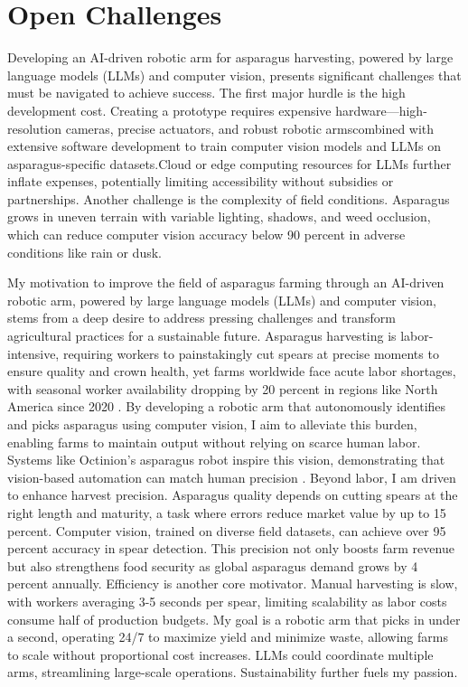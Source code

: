 \section{Open Challenges}



Developing an AI-driven robotic arm for asparagus harvesting, powered by large language models (LLMs) and computer vision, presents significant challenges that must be navigated to achieve success. The first major hurdle is the high development cost. Creating a prototype requires expensive hardware—high-resolution cameras, precise actuators, and robust robotic arms\newline combined with extensive software development to train computer vision models and LLMs on asparagus-specific datasets.Cloud or edge computing resources for LLMs further inflate expenses, potentially limiting accessibility without subsidies or partnerships. Another challenge is the complexity of field conditions. Asparagus grows in uneven terrain with variable lighting, shadows, and weed occlusion, which can reduce computer vision accuracy below 90 percent in adverse conditions like rain or dusk.


My motivation to improve the field of asparagus farming through an AI-driven robotic arm, powered by large language models (LLMs) and computer vision, stems from a deep desire to address pressing challenges and transform agricultural practices for a sustainable future. Asparagus harvesting is labor-intensive, requiring workers to painstakingly cut spears at precise moments to ensure quality and crown health, yet farms worldwide face acute labor shortages, with seasonal worker availability dropping by 20 percent in regions like North America since 2020 . By developing a robotic arm that autonomously identifies and picks asparagus using computer vision, I aim to alleviate this burden, enabling farms to maintain output without relying on scarce human labor. Systems like Octinion’s asparagus robot inspire this vision, demonstrating that vision-based automation can match human precision . Beyond labor, I am driven to enhance harvest precision. Asparagus quality depends on cutting spears at the right length and maturity, a task where errors reduce market value by up to 15 percent. Computer vision, trained on diverse field datasets, can achieve over 95 percent accuracy in spear detection. This precision not only boosts farm revenue but also strengthens food security as global asparagus demand grows by 4 percent annually. Efficiency is another core motivator. Manual harvesting is slow, with workers averaging 3-5 seconds per spear, limiting scalability as labor costs consume half of production budgets. My goal is a robotic arm that picks in under a second, operating 24/7 to maximize yield and minimize waste, allowing farms to scale without proportional cost increases. LLMs could coordinate multiple arms, streamlining large-scale operations. Sustainability further fuels my passion.

